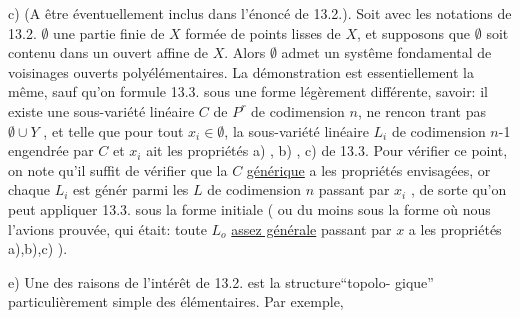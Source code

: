 c) (A être éventuellement inclus dans l'énoncé de 13.2.). Soit
avec les notations de 13.2. $\emptyset$ une partie finie de $X$ formée de points
lisses de $X$, et supposons que $\emptyset$ soit contenu dans un  ouvert affine
de $X$. Alors $\emptyset$ admet un systême fondamental de voisinages ouverts
polyélémentaires.  La démonstration est essentiellement la même, sauf
qu'on formule 13.3. sous une forme légèrement différente, savoir: il
existe une sous-variété linéaire $C$ de $P^r$ de codimension $n$, ne rencon%
trant pas $\emptyset\cup Y$ , et telle que pour tout $x_i\in\emptyset$, la sous-variété
linéaire $L_i$ de codimension $n$-1 engendrée par $C$ et $x_i$ ait les propriétés
a) , b) , c) de 13.3. Pour vérifier ce point, on note qu'il suffit de
vérifier que la $C$ \uline{générique} a les propriétés envisagées, or  
\hand{\unsure{,}} chaque $L_i$ est génér parmi les $L$ de codimension $n$ passant
par $x_i$ , de sorte qu'on peut appliquer 13.3. sous la forme initiale
( ou du moins sous la forme où nous l'avions prouvée, qui était: toute
$L_o$ \uline{assez générale} passant par $x$ a les propriétés a),b),c) ).

e) Une des raisons de l'intérêt de 13.2. est la structure``topolo-%
gique'' particulièrement simple des   élémentaires. Par exemple,


